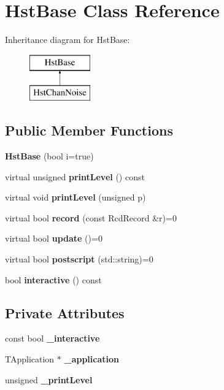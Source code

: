 \section{Hst\-Base Class Reference}
\label{classHstBase}
Inheritance diagram for Hst\-Base\-:\begin{figure}[H]
\begin{center}
\leavevmode
\includegraphics[height=2.000000cm]{classHstBase}
\end{center}
\end{figure}
\subsection*{Public Member Functions}
\begin{DoxyCompactItemize}
\item 
{\bfseries Hst\-Base} (bool i=true)\label{classHstBase_a36170c7c3f81997751b98e57773101ee}

\item 
virtual unsigned {\bfseries print\-Level} () const \label{classHstBase_aa4f0acae99e23ea1cd2bd405259f14e2}

\item 
virtual void {\bfseries print\-Level} (unsigned p)\label{classHstBase_ad125d12a8b12d0acf69da1dac0a9634c}

\item 
virtual bool {\bfseries record} (const Rcd\-Record \&r)=0\label{classHstBase_aedddcccf2663a04211ae01a44947d5ff}

\item 
virtual bool {\bfseries update} ()=0\label{classHstBase_a6b304127c3c6adc87ab30d1f9d4d557c}

\item 
virtual bool {\bfseries postscript} (std\-::string)=0\label{classHstBase_a88ed97ffe429ec2ca0d49faaf9a468ce}

\item 
bool {\bfseries interactive} () const \label{classHstBase_ac3297b878d90b6174577ef0f150cfb75}

\end{DoxyCompactItemize}
\subsection*{Private Attributes}
\begin{DoxyCompactItemize}
\item 
const bool {\bfseries \-\_\-interactive}\label{classHstBase_a65dd208a8144cd46de0a8c12497c5e02}

\item 
T\-Application $\ast$ {\bfseries \-\_\-application}\label{classHstBase_a6d76a46a314f2c728bbea75f5cbb112c}

\item 
unsigned {\bfseries \-\_\-print\-Level}\label{classHstBase_af08876ecbd5e3a7b238b94ef01aaea65}

\end{DoxyCompactItemize}


